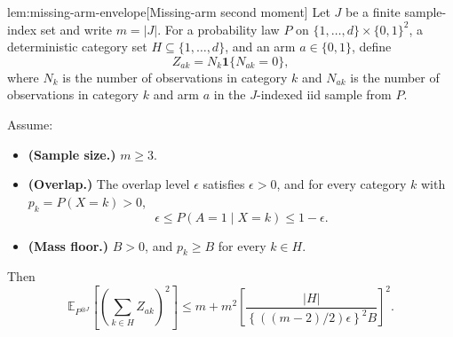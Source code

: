 \documentclass[11pt]{article}
\begin{document}
\begin{lemmav}{lem:missing-arm-envelope}[Missing-arm second moment]
Let \(J\) be a finite sample-index set and write \(m=|J|\). For a probability law \(P\) on \(\{1,\ldots,d\}\times\{0,1\}^2\), a deterministic category set \(H\subseteq\{1,\ldots,d\}\), and an arm \(a\in\{0,1\}\), define
\[
Z_{ak}=N_k\mathbf 1\{N_{ak}=0\},
\]
where \(N_k\) is the number of observations in category \(k\) and \(N_{ak}\) is the number of observations in category \(k\) and arm \(a\) in the \(J\)-indexed iid sample from \(P\).

Assume:
\begin{itemize}
\item \textbf{(Sample size.)} \(m\ge 3\).
\item \textbf{(Overlap.)} The overlap level \(\epsilon\) satisfies \(\epsilon>0\), and for every category \(k\) with \(p_k=P(X=k)>0\),
\[
\epsilon\le P(A=1\mid X=k)\le 1-\epsilon .
\]
\item \textbf{(Mass floor.)} \(B>0\), and \(p_k\ge B\) for every \(k\in H\).
\end{itemize}
Then
\[
\mathbb E_{P^{\otimes J}}\left[
\left(\sum_{k\in H} Z_{ak}\right)^2
\right]
\le
m+m^2
\left[
\frac{|H|}
{\left\{\left((m-2)/2\right)\epsilon\right\}^2 B}
\right]^2 .
\]
\end{lemmav}
\end{document}
